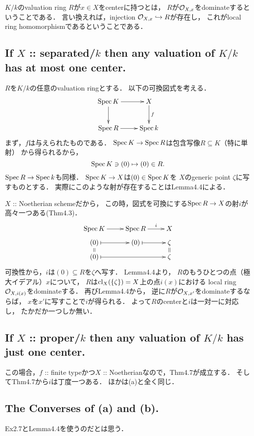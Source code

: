 \documentclass[a4paper]{jsarticle}
\begin{document}
    $K/k$のvaluation ring $R$が$x \in X$をcenterに持つとは，
    $R$が$\mathcal{O}_{X,x}$をdominateするということである．
    言い換えれば，injection $\mathcal{O}_{X,x} \hookrightarrow R$が存在し，
    これがlocal ring homomorphismであるということである．

    \subsection{If $X$ :: separated/$k$ then any valuation of $K/k$ has at most one center.}
    $R$を$K/k$の任意のvaluation ringとする．
    以下の可換図式を考える．
    \[
    \xymatrix
    {
        \Spec K \ar[d] \ar[r]& X \ar[d]^-{f} \\
        \Spec R \ar[r] & \Spec k
    }
    \]
    まず，$f$は与えられたものである．
    $\operatorname{Spec} K \to \operatorname{Spec} R$は包含写像$R \subseteq K$（特に単射）
    から得られるから，
    \[ \operatorname{Spec} K \ni (0) \mapsto (0) \in R. \]
    $\operatorname{Spec} R \to \operatorname{Spec} k$も同様．
    $\operatorname{Spec} K \to X$は$(0) \in \operatorname{Spec} K$を
    $X$のgeneric point $\zeta$に写すものとする．
    実際にこのような射が存在することはLemma4.4による．

    $X$ :: Noetherian schemeだから，
    この時，図式を可換にする$\operatorname{Spec} R \to X$の射$i$が高々一つある(Thm4.3)．
    \[
        \xymatrix@R=5pt
        {
            \Spec K \ar[r]& \Spec R \ar[r]^-{i}& X \\
            (0) \ar@{|->}[r]& (0) \ar@{|->}[r]& \zeta \\
            (0) \ar@{=}[u] \ar@{|->}[rr]& & \zeta \ar@{=}[u]
        }
    \]
    可換性から，$i$は$(0) \subseteq R$を$\zeta$へ写す．
    Lemma4.4より，
    $R$のもうひとつの点（極大イデアル）$x$について，
    $R$は$\operatorname{cl}_X(\{\zeta\})=X$上の点$i(x)$における
    local ring $\mathcal{O}_{X,i(x)}$をdominateする．
    再びLemma4.4から，
    逆に$R$が$\mathcal{O}_{X,x'}$をdominateするならば，
    $x$を$x'$に写すことで$i$が得られる．
    よって$R$のcenterと$i$は一対一に対応し，
    たかだか一つしか無い．

    \subsection{If $X$ :: proper/$k$ then any valuation of $K/k$ has just one center.}
    この場合，$f$ :: finite typeかつ$X$ :: Noetherianなので，Thm4.7が成立する．
    そしてThm4.7から$i$は丁度一つある．
    ほかは(a)と全く同じ．

    \subsection{The Converses of (a) and (b).}
    Ex2.7とLemma4.4を使うのだとは思う．
\end{document}
